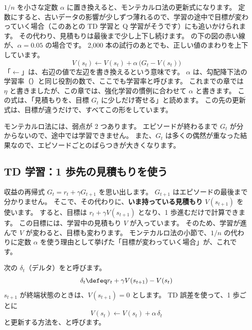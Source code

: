 $1/n$ を小さな定数 $\alpha$ に置き換えると、モンテカルロ法の更新式になります。
定数にすると、古いデータの影響が少しずつ薄れるので、学習の途中で目標が変わっていく場合（このあとの TD 学習と Q 学習がそうです）にも追いかけられます。
その代わり、見積もりは最後まで少し上下し続けます。
の下の図の赤い線が、$\alpha=0.05$ の場合です。
2,000 本の試行のあとでも、正しい値のまわりを上下しています。
\begin{equation}
V(s_t)\leftarrow V(s_t)+\alpha\,\bigl(G_t-V(s_t)\bigr)
\label{eq:rlb-mc}
\end{equation}
「$\leftarrow$」は、右辺の値で左辺を書き換えるという意味です。
$\alpha$ は、勾配降下法の学習率（）と同じ役割の数で、ここでも学習率と呼びます。
これまでの章では $\eta$ と書きましたが、この章では、強化学習の慣例に合わせて $\alpha$ と書きます。
この式は、「見積もりを、目標 $G_t$ に少しだけ寄せる」と読めます。
この先の更新式は、目標が違うだけで、すべてこの形をしています。

モンテカルロ法には、弱点が 2 つあります。
エピソードが終わるまで $G_t$ が分からないので、途中では学習できません。
また、$G_t$ は多くの偶然が重なった結果なので、エピソードごとのばらつきが大きくなります。

\subsection*{TD 学習：1 歩先の見積もりを使う}

収益の再帰式 $G_t=r_t+\gamma G_{t+1}$ を思い出します。
$G_{t+1}$ はエピソードの最後まで分かりません。
そこで、その代わりに、\textbf{いま持っている見積もり} $V(s_{t+1})$ を使います。
すると、目標は $r_t+\gamma V(s_{t+1})$ となり、1 歩進むだけで計算できます。
この目標には、学習中の見積もり $V$ が入っています。
そのため、学習が進んで $V$ が変わると、目標も変わります。
モンテカルロ法の小節で、$1/n$ の代わりに定数 $\alpha$ を使う理由として挙げた「目標が変わっていく場合」が、これです。

\begin{definition}[TD 誤差と TD 学習]\label{def:rlb-td}
次の $\delta_t$（デルタ）をと呼びます。
\begin{equation}
\delta_t\defeq r_t+\gamma V(s_{t+1})-V(s_t)
\label{eq:rlb-td-error}
\end{equation}
$s_{t+1}$ が終端状態のときは、$V(s_{t+1})=0$ とします。
TD 誤差を使って、1 歩ごとに
\begin{equation}
V(s_t)\leftarrow V(s_t)+\alpha\,\delta_t
\label{eq:rlb-td}
\end{equation}
と更新する方法を、と呼びます。
\end{definition}

